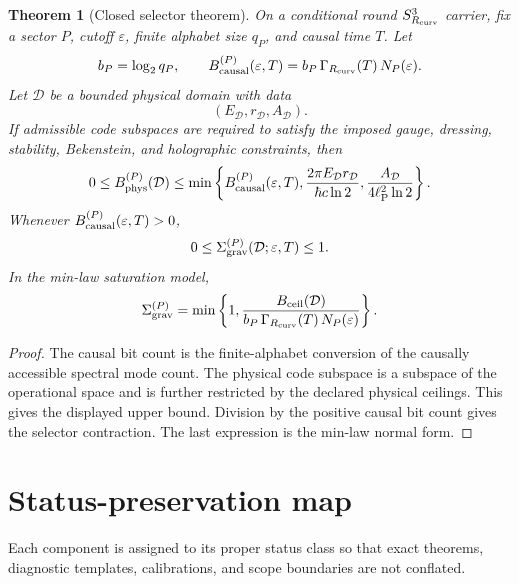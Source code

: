 \documentclass[11pt,a4paper]{article}
\newtheorem{theorem}{Theorem}[section]
\newcommand{\ellP}{\ell_{\rm P}}
\begin{document}
\begin{theorem}[Closed selector theorem]
On a conditional round $S^3_{R_{\rm curv}}$ carrier, fix a sector $P$, cutoff $\varepsilon$, finite alphabet size $q_P$, and causal time $T$.  Let
\[
b_P=\log_2q_P,
\qquad
B_{\rm causal}^{(P)}(\varepsilon,T)
=
b_P\,\Gamma_{R_{\rm curv}}(T)\,N_P(\varepsilon).
\]
Let $\mathcal D$ be a bounded physical domain with data
\[
(E_{\mathcal D},r_{\mathcal D},A_{\mathcal D}).
\]
If admissible code subspaces are required to satisfy the imposed gauge, dressing, stability, Bekenstein, and holographic constraints, then
\[
0\le
B_{\rm phys}^{(P)}(\mathcal D)
\le
\min\left\{
B_{\rm causal}^{(P)}(\varepsilon,T),
\frac{2\pi E_{\mathcal D}r_{\mathcal D}}{\hbar c\ln2},
\frac{A_{\mathcal D}}{4\ellP^2\ln2}
\right\}.
\]
Whenever $B_{\rm causal}^{(P)}(\varepsilon,T)>0$,
\[
0\le
\Sigma_{\rm grav}^{(P)}(\mathcal D;\varepsilon,T)
\le1.
\]
In the min-law saturation model,
\[
\Sigma_{\rm grav}^{(P)}
=
\min\left\{
1,
\frac{B_{\rm ceil}(\mathcal D)}
{b_P\,\Gamma_{R_{\rm curv}}(T)\,N_P(\varepsilon)}
\right\}.
\]
\end{theorem}
\begin{proof}
The causal bit count is the finite-alphabet conversion of the causally accessible spectral mode count.  The physical code subspace is a subspace of the operational space and is further restricted by the declared physical ceilings.  This gives the displayed upper bound.  Division by the positive causal bit count gives the selector contraction.  The last expression is the min-law normal form.
\end{proof}



\section{Status-preservation map}

Each component is assigned to its proper status class so that exact theorems, diagnostic templates, calibrations, and scope boundaries are not conflated.
\end{document}
